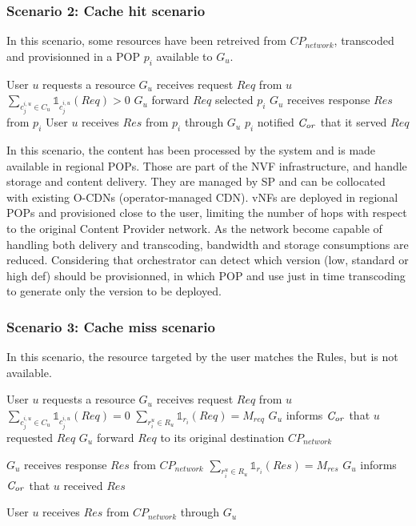 \subsubsection*{Scenario 2: Cache hit scenario}

In this scenario, some resources have been retreived from \(\mathit{CP}_{\mathit{network}}\), transcoded and provisionned in a POP $p_{i}$ available to $G_{u}$.

\begin{algorithmic}[1]
	\STATE User $u$ requests a resource
\STATE $G_{u}$ receives request $\mathit{Req}$ from $u$
\STATE \( \sum_{c^{i,u}_{j}\in C_{u}}{\mathbb{1}_{c^{i,u}_{j}}(\mathit{Req})}>0\)
\STATE $G_{u}$ forward $\mathit{Req}$ selected $p_{i}$
\STATE $G_{u}$ receives response $\mathit{Res}$ from $p_{i}$
\STATE User $u$ receives $\mathit{Res}$ from $p_{i}$ through $G_{u}$
\STATE $p_{i}$ notified $\mathit{C_{or}}$ that it served  $\mathit{Req}$
\end{algorithmic}


In this scenario, the content has been processed by the system and is made available in regional POPs.
Those are part of the NVF infrastructure, and handle storage and content delivery.
They are managed by SP and can be collocated with existing O-CDNs (operator-managed CDN).
vNFs are deployed in regional POPs and provisioned close to the user, limiting the number of hops with respect to the original Content Provider network.
As the network become capable of handling both delivery and transcoding, bandwidth and storage consumptions are reduced. Considering that orchestrator can detect which version (low, standard or high def) should be provisionned, in which POP and use just in time transcoding to generate only the version to be deployed.

\subsubsection*{Scenario 3: Cache miss scenario}

In this scenario, the resource targeted by the user matches the Rules, but is not available.

\begin{algorithmic}[1]
\STATE User $u$ requests a resource
\STATE $G_{u}$ receives request $\mathit{Req}$ from $u$
\STATE \( \sum_{c^{i,u}_{j}\in C_{u}}{\mathbb{1}_{c^{i,u}_{j}}(\mathit{Req})} = 0 \)
\STATE \( \sum_{r^{u}_{i}\in R_{u}}{\mathbb{1}_{r_{i}}(\mathit{Req})} = M_{req}  \)
\STATE $G_{u}$ informs $\mathit{C_{or}}$ that $u$ requested $\mathit{Req}$
\ENDIF
\STATE $G_{u}$ forward $\mathit{Req}$ to its original destination \(\mathit{CP}_{\mathit{network}}\)

\STATE $G_{u}$ receives response $\mathit{Res}$ from \(\mathit{CP}_{\mathit{network}}\){}
	\STATE \( \sum_{r^{u}_{i}\in R_{u}}{\mathbb{1}_{r_{i}}(\mathit{Res})}=M_{res}\) 
	\STATE $G_{u}$ informs $\mathit{C_{or}}$ that $u$ received $\mathit{Res}$
	\ENDIF
\ENDIF

 
\STATE User $u$ receives $\mathit{Res}$ from \(\mathit{CP}_{\mathit{network}}\) through $G_{u}$
\end{algorithmic}

